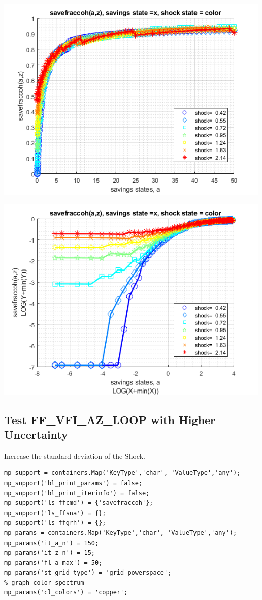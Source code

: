 \documentclass[
]{book}
\begin{document}
\includegraphics[width=5.20833in,height=\textheight]{img/fx_vfi_az_loop_images/figure_4.png}

\includegraphics[width=5.20833in,height=\textheight]{img/fx_vfi_az_loop_images/figure_5.png}

\hypertarget{test-ff_vfi_az_loop-with-higher-uncertainty}{%
\subsection{Test FF\_VFI\_AZ\_LOOP with Higher Uncertainty}\label{test-ff_vfi_az_loop-with-higher-uncertainty}}

Increase the standard deviation of the Shock.

\begin{verbatim}
mp_support = containers.Map('KeyType','char', 'ValueType','any');
mp_support('bl_print_params') = false;
mp_support('bl_print_iterinfo') = false;
mp_support('ls_ffcmd') = {'savefraccoh'};
mp_support('ls_ffsna') = {};
mp_support('ls_ffgrh') = {};
mp_params = containers.Map('KeyType','char', 'ValueType','any');
mp_params('it_a_n') = 150;
mp_params('it_z_n') = 15;
mp_params('fl_a_max') = 50;
mp_params('st_grid_type') = 'grid_powerspace';
% graph color spectrum
mp_params('cl_colors') = 'copper';
\end{verbatim}
\end{document}
